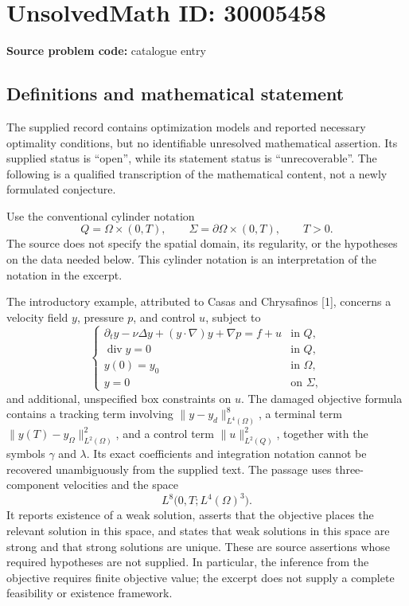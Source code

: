 \documentclass[11pt]{article}
\begin{document}
\section*{UnsolvedMath ID: 30005458}
\textbf{Source problem code:} catalogue entry
\subsection{Definitions and mathematical statement}
The supplied record contains optimization models and reported necessary optimality conditions, but no identifiable unresolved mathematical assertion. Its supplied status is ``open'', while its statement status is ``unrecoverable''. The following is a qualified transcription of the mathematical content, not a newly formulated conjecture.

Use the conventional cylinder notation
\[
Q=\Omega\times(0,T),\qquad \Sigma=\partial\Omega\times(0,T),\qquad T>0.
\]
The source does not specify the spatial domain, its regularity, or the hypotheses on the data needed below. This cylinder notation is an interpretation of the notation in the excerpt.

The introductory example, attributed to Casas and Chrysafinos [1], concerns a velocity field \(y\), pressure \(p\), and control \(u\), subject to
\[
\begin{cases}
\partial_t y-\nu\Delta y+(y\cdot\nabla)y+\nabla p=f+u &\text{in }Q,\\
\operatorname{div}y=0 &\text{in }Q,\\
y(0)=y_0 &\text{in }\Omega,\\
y=0 &\text{on }\Sigma,
\end{cases}
\]
and additional, unspecified box constraints on \(u\). The damaged objective formula contains a tracking term involving \(\|y-y_d\|_{L^4(\Omega)}^8\), a terminal term \(\|y(T)-y_\Omega\|_{L^2(\Omega)}^2\), and a control term \(\|u\|_{L^2(Q)}^2\), together with the symbols \(\gamma\) and \(\lambda\). Its exact coefficients and integration notation cannot be recovered unambiguously from the supplied text. The passage uses three-component velocities and the space
\[
L^8\bigl(0,T;L^4(\Omega)^3\bigr).
\]
It reports existence of a weak solution, asserts that the objective places the relevant solution in this space, and states that weak solutions in this space are strong and that strong solutions are unique. These are source assertions whose required hypotheses are not supplied. In particular, the inference from the objective requires finite objective value; the excerpt does not supply a complete feasibility or existence framework.
\end{document}
